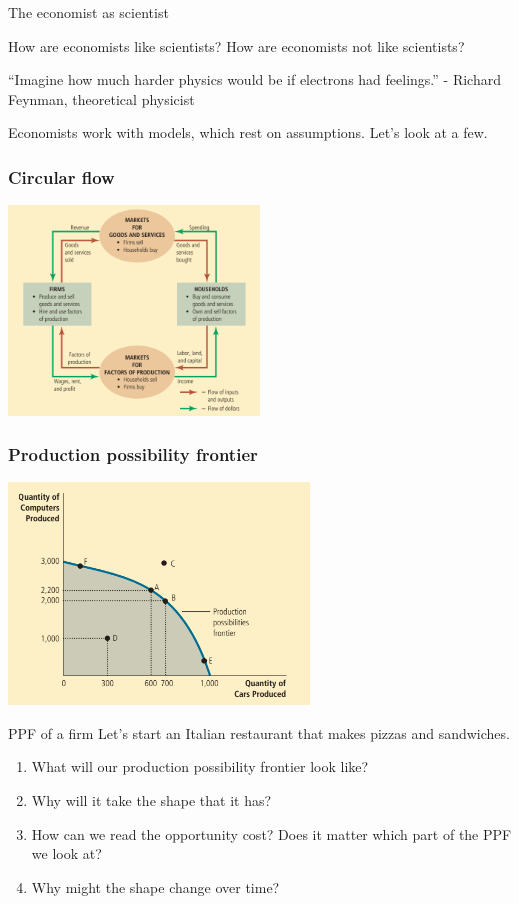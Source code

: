 \documentclass[compress]{beamer}
\begin{document}
\begin{frame}{The economist as scientist}

    How are economists like scientists? 
    How are economists not like scientists?

    \medskip

    \begin{block}{“Imagine how much harder physics would be if electrons had feelings.”}
        - Richard Feynman, theoretical physicist
    \end{block}

    \medskip

    Economists work with models, which rest on assumptions. Let's look at a few.
\end{frame}

\begin{frame}
    \frametitle{Circular flow}
    \centering
    \includegraphics[width = 0.5\textwidth,keepaspectratio]{model1.png}
\end{frame}

\begin{frame}
    \frametitle{Production possibility frontier}
    \centering
    \includegraphics[width = 0.6\textwidth,keepaspectratio]{model2.png}
\end{frame}

\begin{frame}{PPF of a firm}
    Let's start an Italian restaurant that makes pizzas and sandwiches.
    \begin{enumerate}
        \item What will our production possibility frontier look like?
        \item Why will it take the shape that it has?
        \item How can we read the opportunity cost? Does it matter which part of the PPF we look at?
        \item Why might the shape change over time?
    \end{enumerate}
\end{frame}
\end{document}
